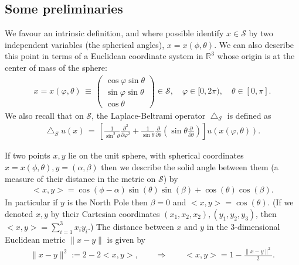 \documentclass[final]{siamltex}
\newcommand{\lap}{\bigtriangleup}
\renewcommand{\S} {\mathcal{S}}
\begin{document}
\subsection{Some preliminaries}
 We favour an intrinsic definition, and where possible identify $x\in \S$ by two independent variables (the spherical angles), $x=x(\phi,\theta)$. We can also describe this point in terms of a Euclidean coordinate system in $\mathbb{R}^3$ whose origin is at the center of mass of the sphere: 
\begin{align*}
 x= x(\varphi,\theta) \, \equiv \, \left( 
  \begin{array}{c}
    \cos \varphi \sin \theta \\
    \sin \varphi \sin \theta \\
    \cos \theta
  \end{array} 
  \right) \in{\S}, \quad \varphi \in [0,2\pi), 
    \quad \theta \in [0,\pi].
\end{align*}
We also recall that on $\S$, the Laplace-Beltrami operator  $\lap_\S$
is defined as
\begin{align*}
  \lap_S u(x) \, = \, \left[
  \frac{1}{\sin^2 \theta} \frac{\partial^2}{\partial \varphi^2} +
  \frac{1}{\sin \theta} \frac{\partial}{\partial \theta}
  \left(\sin \theta \frac{\partial}{ \partial \theta}\right)
  \right] u(x(\varphi,\theta)).
\end{align*}

If two points $x,y$ lie on the unit sphere, with
spherical coordinates $x=x(\phi,\theta), y=(\alpha,\beta)$ then we describe the solid angle between them (a measure of their distance in the metric on $\S$)  by \begin{align*}
  <x,y> =\cos(\phi-\alpha)\sin(\theta)\sin(\beta)+\cos(\theta)\cos(\beta).
\end{align*} 
In particular if $y$ is the North Pole then  $\beta=0$ and
$<x,y>=\cos(\theta)$. (If we denoted $x,y$  by their Cartesian
coordinates $(x_1,x_2,x_2),(y_1,y_2,y_3)$, then $<x,y> = \sum_{i=1}^3
x_iy_i$.) The distance between $x$ and $y$ in the 3-dimensional
Euclidean metric $\|x-y\|$ is given by 
\begin{align*}
  \|x-y\|^2:=
  2-2<x,y>, \qquad \Rightarrow \qquad <x,y>= 1-\frac{\|x-y\|^2}{2}.
\end{align*}
\end{document}
